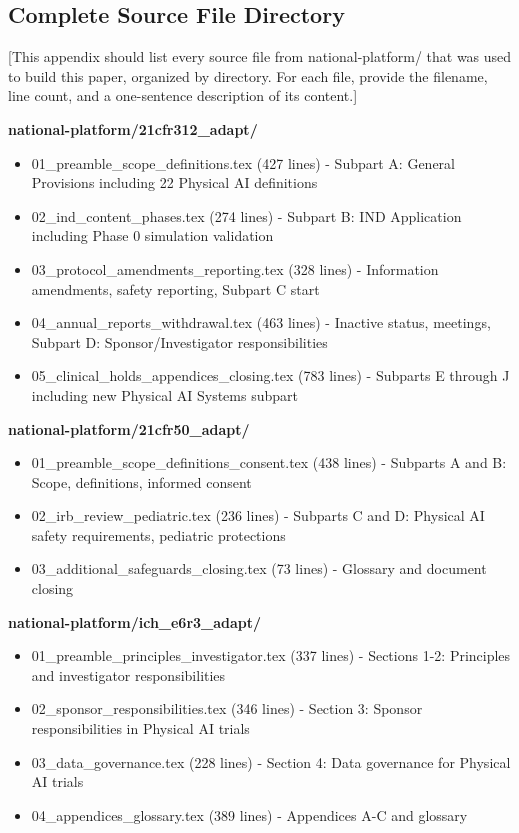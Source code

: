 \pagestyle{appendix}
\appendix
\renewcommand{\thesubsection}{\Alph{subsection}}

\subsection{Complete Source File Directory}
\label{app:source-files}

[This appendix should list every source file from
national-platform/ that was used to build this paper,
organized by directory. For each file, provide the filename,
line count, and a one-sentence description of its content.]

\noindent\textbf{national-platform/21cfr312\_adapt/}
\begin{itemize}[nosep]
  \item 01\_preamble\_scope\_definitions.tex (427 lines) - Subpart A: General
    Provisions including 22 Physical AI definitions
  \item 02\_ind\_content\_phases.tex (274 lines) - Subpart B: IND Application
    including Phase 0 simulation validation
  \item 03\_protocol\_amendments\_reporting.tex (328 lines) - Information
    amendments, safety reporting, Subpart C start
  \item 04\_annual\_reports\_withdrawal.tex (463 lines) - Inactive status,
    meetings, Subpart D: Sponsor/Investigator responsibilities
  \item 05\_clinical\_holds\_appendices\_closing.tex (783 lines) - Subparts
    E through J including new Physical AI Systems subpart
\end{itemize}

\noindent\textbf{national-platform/21cfr50\_adapt/}
\begin{itemize}[nosep]
  \item 01\_preamble\_scope\_definitions\_consent.tex (438 lines) - Subparts
    A and B: Scope, definitions, informed consent
  \item 02\_irb\_review\_pediatric.tex (236 lines) - Subparts C and D:
    Physical AI safety requirements, pediatric protections
  \item 03\_additional\_safeguards\_closing.tex (73 lines) - Glossary and
    document closing
\end{itemize}

\noindent\textbf{national-platform/ich\_e6r3\_adapt/}
\begin{itemize}[nosep]
  \item 01\_preamble\_principles\_investigator.tex (337 lines) - Sections 1-2:
    Principles and investigator responsibilities
  \item 02\_sponsor\_responsibilities.tex (346 lines) - Section 3: Sponsor
    responsibilities in Physical AI trials
  \item 03\_data\_governance.tex (228 lines) - Section 4: Data governance
    for Physical AI trials
  \item 04\_appendices\_glossary.tex (389 lines) - Appendices A-C and glossary
\end{itemize}

